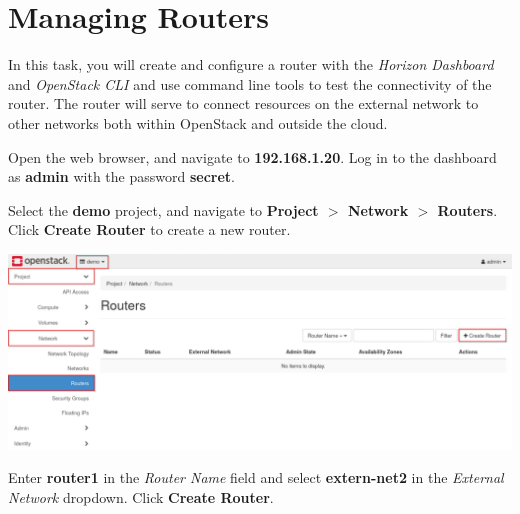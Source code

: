 \documentclass[letterpaper, 12pt]{article}
\begin{document}
\section{Managing Routers}\label{sec:managing-routers}
In this task, you will create and configure a router with the \textit{Horizon Dashboard} and \textit{OpenStack CLI} and use command line tools to test the connectivity of the router.
The router will serve to connect resources on the external network to other networks both within OpenStack and outside the cloud.

\begin{enumerate}
    \begin{labstep}
        Open the web browser, and navigate to \textbf{192.168.1.20}.
        Log in to the dashboard as \textbf{admin} with the password \textbf{secret}.
    \end{labstep}

    \begin{labstep}
        Select the \textbf{demo} project, and navigate to \textbf{Project $>$ Network $>$ Routers}.
        Click \textbf{Create Router} to create a new router.

        \begin{center}
            \includegraphics[width=\linewidth]{images/part2/step2.png}
        \end{center}
    \end{labstep}

    \begin{labstep}
        Enter \textbf{router1} in the \textit{Router Name} field and select \textbf{extern-net2} in the \textit{External Network} dropdown.
        Click \textbf{Create Router}.


\end{labstep}
\end{enumerate}
\end{document}
